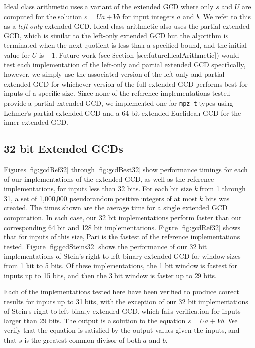 \documentclass{ucalgthes1}
\theoremstyle{definition}
\begin{document}
Ideal class arithmetic uses a variant of the extended GCD where only $s$ and $U$ are computed for the solution $s = Ua + Vb$ for input integers $a$ and $b$.   We refer to this as a \emph{left-only} extended GCD.  Ideal class arithmetic also uses the partial extended GCD, which is similar to the left-only extended GCD but the algorithm is terminated when the next quotient is less than a specified bound, and the initial value for $U$ is $-1$.  Future work (see Section \ref{sec:futureIdealArithmetic}) would test each implementation of the left-only and partial extended GCD specifically, however, we simply use the associated version of the left-only and partial extended GCD for whichever version of the full extended GCD performs best for inputs of a specific size.  Since none of the reference implementations tested provide a partial extended GCD, we implemented one for \texttt{mpz\_t} types using Lehmer's partial extended GCD and a 64 bit extended Euclidean GCD for the inner extended GCD.

\subsection{32 bit Extended GCDs}

Figures \ref{fig:gcdRef32} through \ref{fig:gcdBest32} show performance timings for each of our implementations of the extended GCD, as well as the reference implementations, for inputs less than 32 bits. For each bit size $k$ from 1 through 31, a set of 1,000,000 pseudorandom positive integers of at most $k$ bits was created.  The times shown are the average time for a single extended GCD computation.  In each case, our 32 bit implementations perform faster than our corresponding 64 bit and 128 bit implementations.  Figure \ref{fig:gcdRef32} shows that for inputs of this size, Pari is the fastest of the reference implementations tested.  Figure \ref{fig:gcdSteins32} shows the performance of our 32 bit implementations of Stein's right-to-left binary extended GCD for window sizes from 1 bit to 5 bits.  Of these implementations, the 1 bit window is fastest for inputs up to 15 bits, and then the 3 bit window is faster up to 29 bits.  

Each of the implementations tested here have been verified to produce correct results for inputs up to 31 bits, with the exception of our 32 bit implementations of Stein's right-to-left binary extended GCD, which fails verification for inputs larger than 29 bits.  The output is a solution to the equation $s = Ua + Vb$.  We verify that the equation is satisfied by the output values given the inputs, and that $s$ is the greatest common divisor of both $a$ and $b$.
\end{document}

